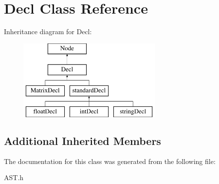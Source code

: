 \hypertarget{classDecl}{\section{Decl Class Reference}
\label{classDecl}
}
Inheritance diagram for Decl\-:\begin{figure}[H]
\begin{center}
\leavevmode
\includegraphics[height=4.000000cm]{classDecl}
\end{center}
\end{figure}
\subsection*{Additional Inherited Members}


The documentation for this class was generated from the following file\-:\begin{DoxyCompactItemize}
\item 
A\-S\-T.\-h\end{DoxyCompactItemize}
